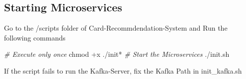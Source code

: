 \documentclass[
]{article}
\newenvironment{Shaded}{}{}
\newcommand{\CommentTok}[1]{\textcolor[rgb]{0.38,0.63,0.69}{\textit{#1}}}
\newcommand{\ExtensionTok}[1]{#1}
\newcommand{\FunctionTok}[1]{\textcolor[rgb]{0.02,0.16,0.49}{#1}}
\newcommand{\NormalTok}[1]{#1}
\begin{document}
\hypertarget{starting-microservices}{%
\subsection{Starting Microservices}\label{starting-microservices}}

Go to the /scripts folder of Card-Recommdendation-System and Run the
following commands

\begin{Shaded}
\begin{Highlighting}[]
\CommentTok{\# Execute only once}
\FunctionTok{chmod}\NormalTok{ +x ./init*}
\CommentTok{\# Start the Microservices}
\ExtensionTok{./init.sh}
\end{Highlighting}
\end{Shaded}

If the script fails to run the Kafka-Server, fix the Kafka Path in
init\_kafka.sh
\end{document}
